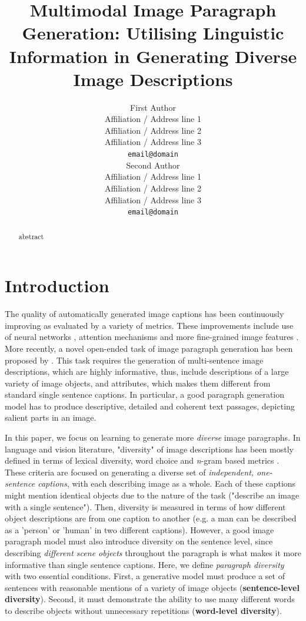 \documentclass[11pt,a4paper]{article}
\title{Multimodal Image Paragraph Generation: Utilising Linguistic Information in Generating Diverse Image Descriptions}
\author{First Author \\
 Affiliation / Address line 1 \\
 Affiliation / Address line 2 \\
 Affiliation / Address line 3 \\
 \texttt{email@domain} \\\And
 Second Author \\
 Affiliation / Address line 1 \\
 Affiliation / Address line 2 \\
 Affiliation / Address line 3 \\
 \texttt{email@domain} \\}
\date{}
\begin{document}
\maketitle
\begin{abstract}
abstract

\end{abstract}

\section{Introduction}

The quality of automatically generated image captions \cite{bernardi2016automatic} has been continuously improving as evaluated by a variety of metrics.
These improvements include use of neural networks \cite{kiros14,vinyals2014tell}, attention mechanisms \cite{xu2015attend} and more fine-grained image features \cite{anderson2017bottomup}.
More recently, a novel open-ended task of image paragraph generation has been proposed by .
This task requires the generation of multi-sentence image descriptions, which are highly informative, thus, include descriptions of a large variety of image objects, and attributes, which makes them different from standard single sentence captions.
In particular, a good paragraph generation model has to produce descriptive, detailed and coherent text passages, depicting salient parts in an image.

In this paper, we focus on learning to generate more \textit{diverse} image paragraphs.
In language and vision literature, "diversity" of image descriptions has been mostly defined in terms of lexical diversity, word choice and \textit{n}-gram based metrics \cite{Devlin2015, Vijayakumar2016, Lindh2018, VanMiltenburg2018}.
These criteria are focused on generating a diverse set of \textit{independent, one-sentence captions}, with each describing image as a whole.
Each of these captions might mention identical objects due to the nature of the task ("describe an image with a single sentence"). Then, diversity is measured in terms of how different object descriptions are from one caption to another (e.g. a man can be described as a 'person' or 'human' in two different captions).
However, a good image paragraph model must also introduce diversity on the sentence level, since describing \textit{different scene objects} throughout the paragraph is what makes it more informative than single sentence captions.
Here, we define \textit{paragraph diversity} with two essential conditions. First, a generative model must produce a set of sentences with reasonable mentions of a variety of image objects (\textbf{sentence-level diversity}). Second, it must demonstrate the ability to use many different words to describe objects without unnecessary repetitions (\textbf{word-level diversity}).
\end{document}
